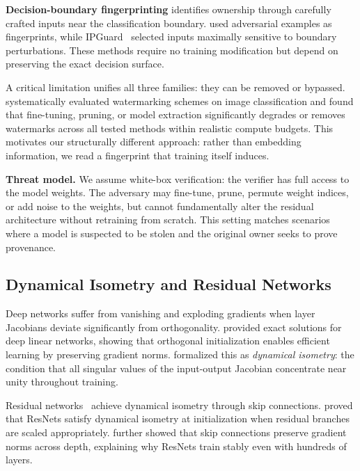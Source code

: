 \documentclass[wcp]{jmlr}
\begin{document}
\textbf{Decision-boundary fingerprinting} identifies ownership through carefully crafted inputs near the classification boundary. \citet{le2020adversarial} used adversarial examples as fingerprints, while IPGuard~\citep{cao2021ipguard} selected inputs maximally sensitive to boundary perturbations. These methods require no training modification but depend on preserving the exact decision surface.

A critical limitation unifies all three families: they can be removed or bypassed. \citet{lukas2022sok} systematically evaluated watermarking schemes on image classification and found that fine-tuning, pruning, or model extraction significantly degrades or removes watermarks across all tested methods within realistic compute budgets. This motivates our structurally different approach: rather than embedding information, we read a fingerprint that training itself induces.

\textbf{Threat model.} We assume white-box verification: the verifier has full access to the model weights. The adversary may fine-tune, prune, permute weight indices, or add noise to the weights, but cannot fundamentally alter the residual architecture without retraining from scratch. This setting matches scenarios where a model is suspected to be stolen and the original owner seeks to prove provenance.

\subsection{Dynamical Isometry and Residual Networks}

Deep networks suffer from vanishing and exploding gradients when layer Jacobians deviate significantly from orthogonality. \citet{saxe2014exact} provided exact solutions for deep linear networks, showing that orthogonal initialization enables efficient learning by preserving gradient norms. \citet{pennington2017isometry} formalized this as \emph{dynamical isometry}: the condition that all singular values of the input-output Jacobian concentrate near unity throughout training.

Residual networks~\citep{he2016deep} achieve dynamical isometry through skip connections. \citet{tarnowski2019dynamical} proved that ResNets satisfy dynamical isometry at initialization when residual branches are scaled appropriately. \citet{zaeemzadeh2020norm} further showed that skip connections preserve gradient norms across depth, explaining why ResNets train stably even with hundreds of layers.
\end{document}
